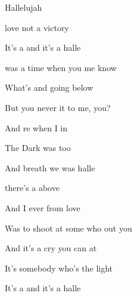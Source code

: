 \begin{SBSong}{Hallelujah}
\begin{SBVerse}
    love  not a victory 
    
    It's a  and it's a  halle
  \end{SBVerse}
  \CBPageBrk
  \begin{SBVerse}
     was a time when you  me know
    
    What's  and going  below
    
    But  you never  it to me,  you? 

    And re when I  in 
    
    The  Dark was  too
    
    And  breath we  was halle
  \end{SBVerse}
  \begin{SBVerse}
     there's a  above
    
    And  I ever  from love
    
    Was  to shoot at some who out you 
 
    And it's  a cry you can  at 
    
    It's  somebody who's  the light
    
    It's a  and it's a  halle
  \end{SBVerse}
\end{SBSong}
